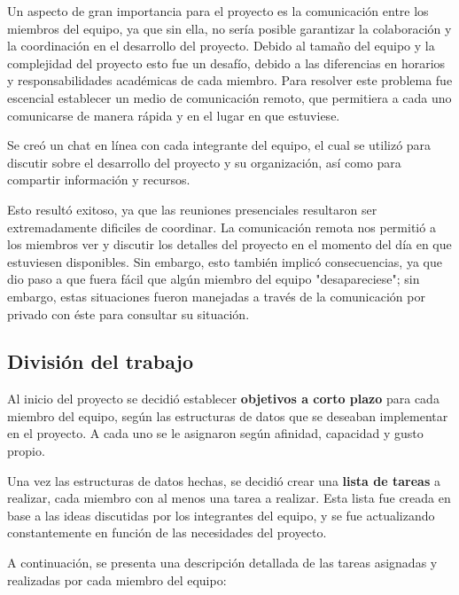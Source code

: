 \documentclass[9pt,letterpaper,onecolumn]{rho-class/rho}
\begin{document}
Un aspecto de gran importancia para el proyecto es la comunicación entre los miembros del equipo, ya que sin ella, no sería posible garantizar la colaboración y la coordinación en el desarrollo del proyecto. Debido al tamaño del equipo y la complejidad del proyecto esto fue un desafío, debido a las diferencias en horarios y responsabilidades académicas de cada miembro. Para resolver este problema fue escencial establecer un medio de comunicación remoto, que permitiera a cada uno comunicarse de manera rápida y en el lugar en que estuviese.

Se creó un chat en línea con cada integrante del equipo, el cual se utilizó para discutir sobre el desarrollo del proyecto y su organización, así como para compartir información y recursos.

\vspace{0.5cm}

Esto resultó exitoso, ya que las reuniones presenciales resultaron ser extremadamente dificiles de coordinar. La comunicación remota nos permitió a los miembros ver y discutir los detalles del proyecto en el momento del día en que estuviesen disponibles. Sin embargo, esto también implicó consecuencias, ya que dio paso a que fuera fácil que algún miembro del equipo "desapareciese"; sin embargo, estas situaciones fueron manejadas a través de la comunicación por privado con éste para consultar su situación.

\subsection{División del trabajo}

Al inicio del proyecto se decidió establecer \textbf{objetivos a corto plazo} para cada miembro del equipo, según las estructuras de datos que se deseaban implementar en el proyecto. A cada uno se le asignaron según afinidad, capacidad y gusto propio.

\vspace{0.5cm}

Una vez las estructuras de datos hechas, se decidió crear una \textbf{lista de tareas} a realizar, cada miembro con al menos una tarea a realizar. Esta lista fue creada en base a las ideas discutidas por los integrantes del equipo, y se fue actualizando constantemente en función de las necesidades del proyecto.

A continuación, se presenta una descripción detallada de las tareas asignadas y realizadas por cada miembro del equipo:
\end{document}
